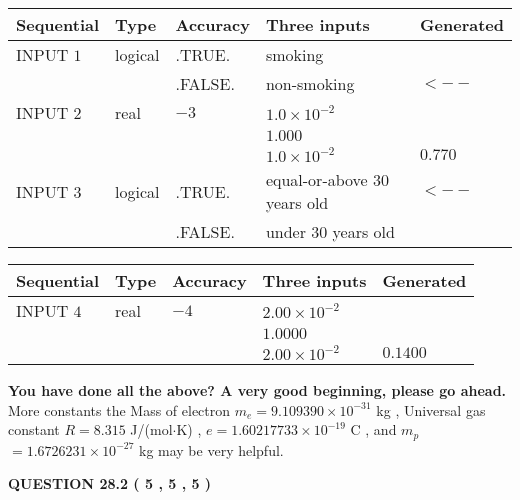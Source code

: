 \documentclass[12pt]{article}
\begin{document}
   
  
  
\noindent\begin{tabular}{|l|l|l|l|l|}
\hline
 Sequential & Type & Accuracy & Three inputs & Generated \\ 
\hline
 
 
  INPUT $            1 $ & logical & .TRUE. & 
 smoking & 
  \\
  & & .FALSE. & 
  non-smoking & 
  $ <-- $ 
 \\  \hline  
 
 
  INPUT $            2 $ & real & $           -3  $ & $
 1.0 \times 10^{-2}
  $ & \\
  & & &  $
 1.000
  $ & \\
  & & &  $
 1.0 \times 10^{-2}
 $ & $ 0.770 $ 
 \\  \hline  
 
 
  INPUT $            3 $ & logical & .TRUE. & 
 equal-or-above 30 years old & 
  $ <-- $ 
  \\
  & & .FALSE. & 
  under 30 years old & 
 \\  \hline  
 \end{tabular}
   
   
  
  
\noindent\begin{tabular}{|l|l|l|l|l|}
\hline
 Sequential & Type & Accuracy & Three inputs & Generated \\ 
\hline
 
 
  INPUT $            4 $ & real & $           -4  $ & $
 2.00 \times 10^{-2}
  $ & \\
  & & &  $
 1.0000
  $ & \\
  & & &  $
 2.00 \times 10^{-2}
 $ & $ 0.1400 $ 
 \\  \hline  
 \end{tabular}
   
   
   
   
\vspace{0.3in}
{\textbf{\LARGE{You have done all the above? A very good beginning, please go ahead.}}}
More constants the
Mass of electron
$m_e$$ =
9.109390 \times 10^{-31} $
kg
,
Universal gas constant
$R$$ =
8.315 $
J/(mol$\cdot $K)
,
$e$$ =
1.60217733 \times 10^{-19} $
C
, and
$m_p$$ =
1.6726231 \times 10^{-27} $
kg
%
may be very helpful.
\vspace{0.3in}
   
   
  
\vspace{0.2in}
  
{\textbf{\Large{QUESTION
28.2 
 (           5 ,           5 ,           5 )
}}}
  
\end{document}

